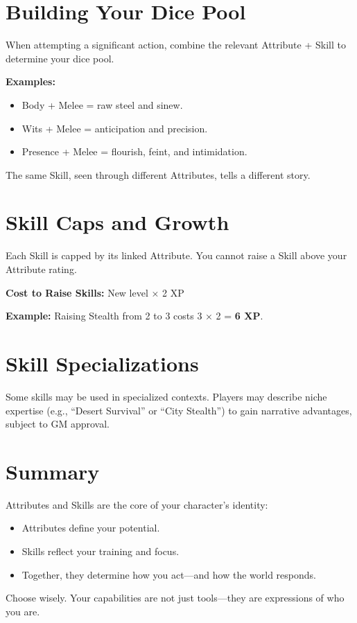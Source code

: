 \section{Building Your Dice Pool}

When attempting a significant action, combine the relevant Attribute + Skill to determine your dice pool.

\textbf{Examples:}
\begin{itemize}
  \item Body + Melee = raw steel and sinew.
  \item Wits + Melee = anticipation and precision.
  \item Presence + Melee = flourish, feint, and intimidation.
\end{itemize}

The same Skill, seen through different Attributes, tells a different story.

\section{Skill Caps and Growth}

Each Skill is capped by its linked Attribute. You cannot raise a Skill above your Attribute rating.

\textbf{Cost to Raise Skills:} New level × 2 XP

\textbf{Example:} Raising Stealth from 2 to 3 costs 3 × 2 = \textbf{6 XP}.

\section{Skill Specializations}

Some skills may be used in specialized contexts. Players may describe niche expertise (e.g., “Desert Survival” or “City Stealth”) to gain narrative advantages, subject to GM approval.

\section{Summary}

Attributes and Skills are the core of your character’s identity:

\begin{itemize}
  \item Attributes define your potential.
  \item Skills reflect your training and focus.
  \item Together, they determine how you act—and how the world responds.
\end{itemize}

Choose wisely. Your capabilities are not just tools—they are expressions of who you are.

